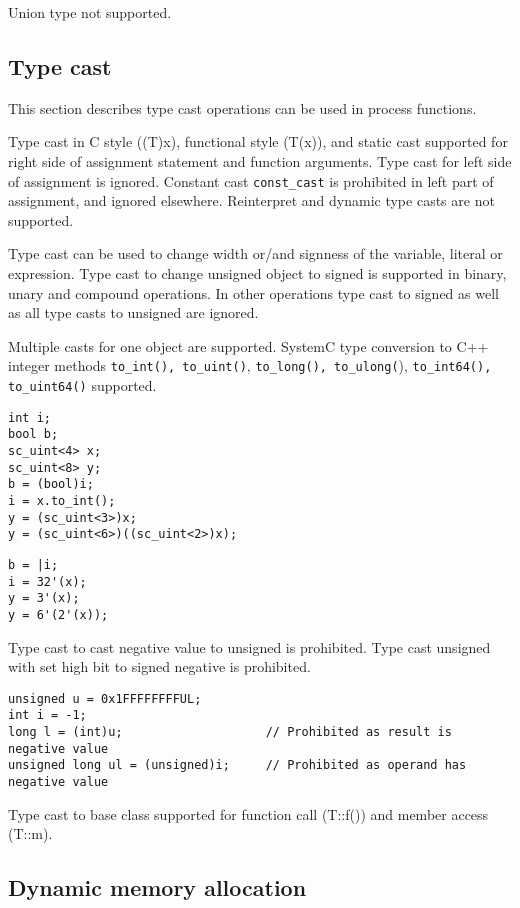 Union type not supported.

\subsection{Type cast}

This section describes type cast operations can be used in process functions. 

Type cast in C style ((T)x), functional style (T(x)), and static cast supported for right side of assignment statement and function arguments. Type cast for left side of assignment is ignored. 
Constant cast {\tt const\_cast} is prohibited in left part of assignment, and ignored elsewhere. Reinterpret and dynamic type casts are not supported.

Type cast can be used to change width or/and signness of the variable, literal or expression. 
Type cast to change unsigned object to signed is supported in binary, unary and compound operations. In other operations type cast to signed as well as all type casts to unsigned are ignored. 

Multiple casts for one object are supported. 
SystemC type conversion to C++ integer methods {\tt to\_int(), to\_uint()}, {\tt to\_long(), to\_ulong(}), {\tt to\_int64(), to\_uint64()} supported. 
%
\begin{lstlisting}[style=mycpp]
int i;
bool b;
sc_uint<4> x;
sc_uint<8> y;
b = (bool)i; 
i = x.to_int();
y = (sc_uint<3>)x;
y = (sc_uint<6>)((sc_uint<2>)x);
\end{lstlisting}
%
\begin{lstlisting}[style=myverilog]
b = |i;
i = 32'(x);
y = 3'(x);
y = 6'(2'(x));
\end{lstlisting}

Type cast to cast negative value to unsigned is prohibited. Type cast unsigned with set high bit to signed negative is prohibited.
%
\begin{lstlisting}[style=mycpp]
unsigned u = 0x1FFFFFFFFUL;
int i = -1;
long l = (int)u;                    // Prohibited as result is negative value
unsigned long ul = (unsigned)i;     // Prohibited as operand has negative value
\end{lstlisting}

Type cast to base class supported for function call (T::f()) and member access (T::m).


\subsection{Dynamic memory allocation}

